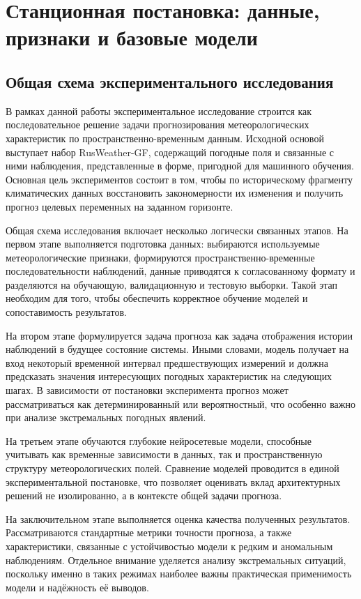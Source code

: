 
\chapter{Станционная постановка: данные, признаки и базовые модели}

\section{Общая схема экспериментального исследования}

В рамках данной работы экспериментальное исследование строится как последовательное решение задачи прогнозирования метеорологических характеристик по пространственно-временным данным. Исходной основой выступает набор RusWeather-GF, содержащий погодные поля и связанные с ними наблюдения, представленные в форме, пригодной для машинного обучения. Основная цель экспериментов состоит в том, чтобы по историческому фрагменту климатических данных восстановить закономерности их изменения и получить прогноз целевых переменных на заданном горизонте.

Общая схема исследования включает несколько логически связанных этапов. На первом этапе выполняется подготовка данных: выбираются используемые метеорологические признаки, формируются пространственно-временные последовательности наблюдений, данные приводятся к согласованному формату и разделяются на обучающую, валидационную и тестовую выборки. Такой этап необходим для того, чтобы обеспечить корректное обучение моделей и сопоставимость результатов.

На втором этапе формулируется задача прогноза как задача отображения истории наблюдений в будущее состояние системы. Иными словами, модель получает на вход некоторый временной интервал предшествующих измерений и должна предсказать значения интересующих погодных характеристик на следующих шагах. В зависимости от постановки эксперимента прогноз может рассматриваться как детерминированный или вероятностный, что особенно важно при анализе экстремальных погодных явлений.

На третьем этапе обучаются глубокие нейросетевые модели, способные учитывать как временные зависимости в данных, так и пространственную структуру метеорологических полей. Сравнение моделей проводится в единой экспериментальной постановке, что позволяет оценивать вклад архитектурных решений не изолированно, а в контексте общей задачи прогноза.

На заключительном этапе выполняется оценка качества полученных результатов. Рассматриваются стандартные метрики точности прогноза, а также характеристики, связанные с устойчивостью модели к редким и аномальным наблюдениям. Отдельное внимание уделяется анализу экстремальных ситуаций, поскольку именно в таких режимах наиболее важны практическая применимость модели и надёжность её выводов.

